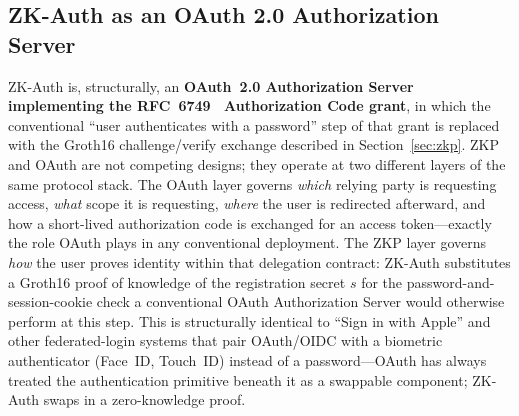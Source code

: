 \documentclass[journal,twoside,10pt]{IEEEtran}
\begin{document}
\subsection{ZK-Auth as an OAuth 2.0 Authorization Server}
\label{sec:oauth_zkp}
ZK-Auth is, structurally, an \textbf{OAuth~2.0 Authorization Server
implementing the RFC~6749~\cite{oauth2} Authorization Code grant}, in
which the conventional ``user authenticates with a password'' step of
that grant is replaced with the Groth16 challenge/verify exchange
described in Section~\ref{sec:zkp}. ZKP and OAuth are not competing
designs; they operate at two different layers of the same protocol
stack. The OAuth layer governs \textit{which} relying party is
requesting access, \textit{what} scope it is requesting, \textit{where}
the user is redirected afterward, and how a short-lived authorization
code is exchanged for an access token---exactly the role OAuth plays in
any conventional deployment. The ZKP layer governs \textit{how} the
user proves identity within that delegation contract: ZK-Auth
substitutes a Groth16 proof of knowledge of the registration secret $s$
for the password-and-session-cookie check a conventional OAuth
Authorization Server would otherwise perform at this step. This is
structurally identical to ``Sign in with Apple'' and other federated-login
systems that pair OAuth/OIDC with a biometric authenticator (Face~ID,
Touch~ID) instead of a password---OAuth has always treated the
authentication primitive beneath it as a swappable component; ZK-Auth
swaps in a zero-knowledge proof.
\end{document}
